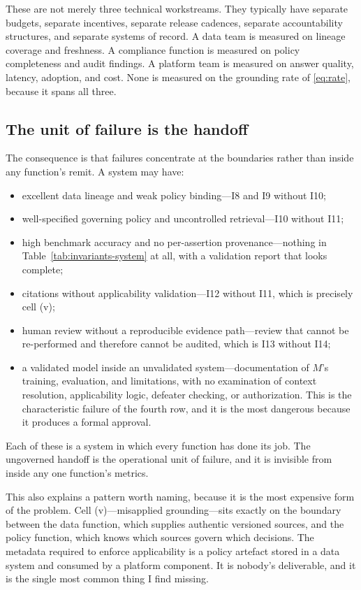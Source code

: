 These are not merely three technical workstreams. They typically have separate
budgets, separate incentives, separate release cadences, separate accountability
structures, and separate systems of record. A data team is measured on lineage
coverage and freshness. A compliance function is measured on policy completeness
and audit findings. A platform team is measured on answer quality, latency,
adoption, and cost. None is measured on the grounding rate of
\eqref{eq:rate}, because it spans all three.

\subsection{The unit of failure is the handoff}

The consequence is that failures concentrate at the boundaries rather than inside
any function's remit. A system may have:

\begin{itemize}
  \item excellent data lineage and weak policy binding---I8 and I9 without I10;
  \item well-specified governing policy and uncontrolled retrieval---I10 without
        I11;
  \item high benchmark accuracy and no per-assertion provenance---nothing in
        Table~\ref{tab:invariants-system} at all, with a validation report that
        looks complete;
  \item citations without applicability validation---I12 without I11, which is
        precisely cell (v);
  \item human review without a reproducible evidence path---review that cannot be
        re-performed and therefore cannot be audited, which is I13 without I14;
  \item a validated model inside an unvalidated system---documentation of $M$'s
        training, evaluation, and limitations, with no examination of context
        resolution, applicability logic, defeater checking, or authorization. This is
        the characteristic failure of the fourth row, and it is the most dangerous
        because it produces a formal approval.
\end{itemize}

Each of these is a system in which every function has done its job. The ungoverned
handoff is the operational unit of failure, and it is invisible from inside any one
function's metrics.

This also explains a pattern worth naming, because it is the most expensive form of
the problem. Cell (v)---misapplied grounding---sits exactly on the boundary between
the data function, which supplies authentic versioned sources, and the policy
function, which knows which sources govern which decisions. The metadata required to
enforce applicability is a policy artefact stored in a data system and consumed by a
platform component. It is nobody's deliverable, and it is the single most common
thing I find missing.

